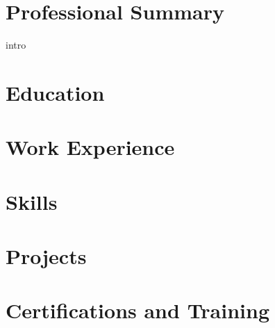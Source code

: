 \documentclass[11pt, a4paper, sans]{moderncv}
\begin{document}
\makecvtitle

\section{Professional Summary}
{intro}

\section{Education}

\section{Work Experience}
\vspace{-\baselineskip}

\section{Skills}

\section{Projects}
\vspace{-\baselineskip}

\section{Certifications and Training}
\end{document}
